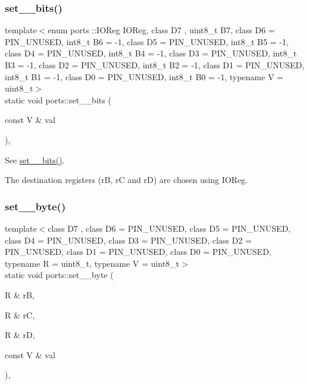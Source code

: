 \subsubsection{\texorpdfstring{set\+\_\+\_\+bits()}{set\_8\_bits()}\hspace{0.1cm}{\footnotesize\ttfamily [2/2]}}
{\footnotesize\ttfamily template$<$enum ports \+::\+I\+O\+Reg I\+O\+Reg, class D7 , uint8\+\_\+t B7, class D6  = P\+I\+N\+\_\+\+U\+N\+U\+S\+ED, int8\+\_\+t B6 = -\/1, class D5  = P\+I\+N\+\_\+\+U\+N\+U\+S\+ED, int8\+\_\+t B5 = -\/1, class D4  = P\+I\+N\+\_\+\+U\+N\+U\+S\+ED, int8\+\_\+t B4 = -\/1, class D3  = P\+I\+N\+\_\+\+U\+N\+U\+S\+ED, int8\+\_\+t B3 = -\/1, class D2  = P\+I\+N\+\_\+\+U\+N\+U\+S\+ED, int8\+\_\+t B2 = -\/1, class D1  = P\+I\+N\+\_\+\+U\+N\+U\+S\+ED, int8\+\_\+t B1 = -\/1, class D0  = P\+I\+N\+\_\+\+U\+N\+U\+S\+ED, int8\+\_\+t B0 = -\/1, typename V  = uint8\+\_\+t$>$ \\
static void ports\+::set\+\_\+\_\+bits (\begin{DoxyParamCaption}\item[{const V \&}]{val }\end{DoxyParamCaption})\hspace{0.3cm}{\ttfamily [inline]}, {\ttfamily [static]}}



See \hyperlink{namespaceports_aac15fb87d8fede3f2bf8d764ab42965f}{set\+\_\+\_\+bits()}. 

The destination registers ({\ttfamily rB}, {\ttfamily rC} and {\ttfamily rD}) are chosen using I\+O\+Reg. \hypertarget{namespaceports_a7034c689dd509dc9c11ba8be46a26fd0}{}\label{namespaceports_a7034c689dd509dc9c11ba8be46a26fd0} 
\subsubsection{\texorpdfstring{set\+\_\+\_\+byte()}{set\_8\_byte()}\hspace{0.1cm}{\footnotesize\ttfamily [1/2]}}
{\footnotesize\ttfamily template$<$class D7 , class D6  = P\+I\+N\+\_\+\+U\+N\+U\+S\+ED, class D5  = P\+I\+N\+\_\+\+U\+N\+U\+S\+ED, class D4  = P\+I\+N\+\_\+\+U\+N\+U\+S\+ED, class D3  = P\+I\+N\+\_\+\+U\+N\+U\+S\+ED, class D2  = P\+I\+N\+\_\+\+U\+N\+U\+S\+ED, class D1  = P\+I\+N\+\_\+\+U\+N\+U\+S\+ED, class D0  = P\+I\+N\+\_\+\+U\+N\+U\+S\+ED, typename R  = uint8\+\_\+t, typename V  = uint8\+\_\+t$>$ \\
static void ports\+::set\+\_\+\_\+byte (\begin{DoxyParamCaption}\item[{R \&}]{rB,  }\item[{R \&}]{rC,  }\item[{R \&}]{rD,  }\item[{const V \&}]{val }\end{DoxyParamCaption})\hspace{0.3cm}{\ttfamily [inline]}, {\ttfamily [static]}}



